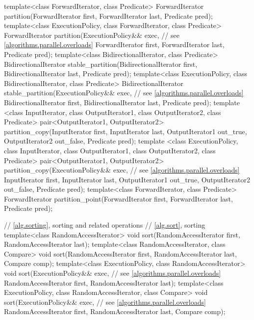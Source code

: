 \begin{codeblock}
{  template<class ForwardIterator, class Predicate>
    ForwardIterator partition(ForwardIterator first,
                              ForwardIterator last,
                              Predicate pred);
  template<class ExecutionPolicy, class ForwardIterator, class Predicate>
    ForwardIterator partition(ExecutionPolicy&& exec, // see \ref{algorithms.parallel.overloads}
                              ForwardIterator first,
                              ForwardIterator last,
                              Predicate pred);
  template<class BidirectionalIterator, class Predicate>
    BidirectionalIterator stable_partition(BidirectionalIterator first,
                                           BidirectionalIterator last,
                                           Predicate pred);
  template<class ExecutionPolicy, class BidirectionalIterator, class Predicate>
    BidirectionalIterator stable_partition(ExecutionPolicy&& exec, // see \ref{algorithms.parallel.overloads}
                                           BidirectionalIterator first,
                                           BidirectionalIterator last,
                                           Predicate pred);
  template <class InputIterator, class OutputIterator1,
            class OutputIterator2, class Predicate>
    pair<OutputIterator1, OutputIterator2>
    partition_copy(InputIterator first, InputIterator last,
                   OutputIterator1 out_true, OutputIterator2 out_false,
                   Predicate pred);
  template <class ExecutionPolicy, class InputIterator, class OutputIterator1,
            class OutputIterator2, class Predicate>
    pair<OutputIterator1, OutputIterator2>
    partition_copy(ExecutionPolicy&& exec, // see \ref{algorithms.parallel.overloads}
                   InputIterator first, InputIterator last,
                   OutputIterator1 out_true, OutputIterator2 out_false,
                   Predicate pred);
  template<class ForwardIterator, class Predicate>
    ForwardIterator partition_point(ForwardIterator first,
                                    ForwardIterator last,
                                    Predicate pred);

  // \ref{alg.sorting}, sorting and related operations
  // \ref{alg.sort}, sorting
  template<class RandomAccessIterator>
    void sort(RandomAccessIterator first, RandomAccessIterator last);
  template<class RandomAccessIterator, class Compare>
    void sort(RandomAccessIterator first, RandomAccessIterator last,
              Compare comp);
  template<class ExecutionPolicy, class RandomAccessIterator>
    void sort(ExecutionPolicy&& exec, // see \ref{algorithms.parallel.overloads}
              RandomAccessIterator first, RandomAccessIterator last);
  template<class ExecutionPolicy, class RandomAccessIterator, class Compare>
    void sort(ExecutionPolicy&& exec, // see \ref{algorithms.parallel.overloads}
              RandomAccessIterator first, RandomAccessIterator last,
              Compare comp);

}
\end{codeblock}
